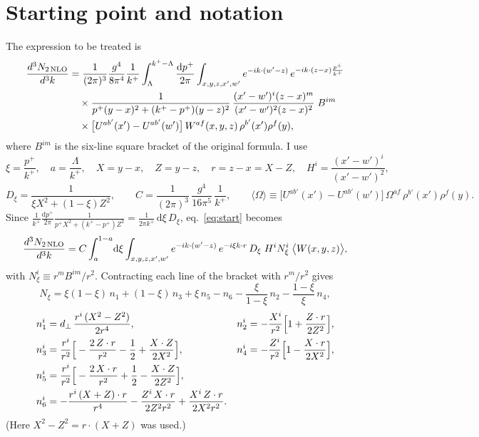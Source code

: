 \documentclass[11pt,a4paper]{article}
\newcommand{\dd}{\mathrm{d}}
\newcommand{\cl}[1]{\big\langle #1\big\rangle}
\begin{document}
\section{Starting point and notation}
The expression to be treated is
\begin{align}
\frac{d^{3}N_{2\,\rm NLO}}{d^{3}k}
&=\frac{1}{(2\pi)^{3}}\frac{g^{4}}{8\pi^{4}}\frac{1}{k^{+}}
\int_{\Lambda}^{k^{+}-\Lambda}\frac{\dd p^{+}}{2\pi}\int_{x,y,z,x',w'}
e^{-ik\cdot(w'-z)}\,e^{-ik\cdot(z-x)\frac{p^{+}}{k^{+}}}\notag\\
&\quad\times\frac{1}{p^{+}(y-x)^{2}+(k^{+}-p^{+})(y-z)^{2}}\,
\frac{(x'-w')^{i}(z-x)^{m}}{(x'-w')^{2}(z-x)^{2}}\;B^{im}\notag\\
&\quad\times
\big[U^{ab'}(x')-U^{ab'}(w')\big]\,W^{af}(x,y,z)\,\rho^{b'}(x')\rho^{f}(y),
\label{eq:start}
\end{align}
where $B^{im}$ is the six-line square bracket of the original formula. I use
\begin{equation}
\xi=\frac{p^+}{k^+},\quad a=\frac{\Lambda}{k^+},\quad
X=y-x,\quad Z=y-z,\quad r=z-x=X-Z,\quad H^i=\frac{(x'-w')^i}{(x'-w')^2},
\end{equation}
\begin{equation}
D_\xi=\frac{1}{\xi X^2+(1-\xi)Z^2},\qquad
C=\frac{1}{(2\pi)^3}\,\frac{g^4}{16\pi^5}\,\frac{1}{k^+},\qquad
\cl{\Omega}\equiv\big[U^{ab'}(x')-U^{ab'}(w')\big]\,\Omega^{af}\,\rho^{b'}(x')\rho^f(y).
\end{equation}
Since $\frac{1}{k^+}\frac{\dd p^+}{2\pi}\frac{1}{p^+X^2+(k^+-p^+)Z^2}=\frac{1}{2\pi k^+}\,\dd\xi\,D_\xi$,
eq.~\eqref{eq:start} becomes
\begin{equation}
\frac{d^{3}N_{2\,\rm NLO}}{d^{3}k}=C\int_a^{1-a}\!\dd\xi\int_{x,y,z,x',w'}
e^{-ik\cdot(w'-z)}\,e^{-i\xi k\cdot r}\,D_\xi\;H^i N^i_\xi\;\cl{W(x,y,z)} ,
\label{eq:compact}
\end{equation}
with $N^i_\xi\equiv r^mB^{im}/r^2$. Contracting each line of the bracket with $r^m/r^2$ gives
\begin{equation}
N_\xi=\xi(1-\xi)\,n_1+(1-\xi)\,n_3+\xi\,n_5-n_6-\frac{\xi}{1-\xi}\,n_2-\frac{1-\xi}{\xi}\,n_4 ,
\label{eq:N}
\end{equation}
\begin{align}
n_1^i&=d_\perp\,\frac{r^i\,(X^2-Z^2)}{2r^4}, &
n_2^i&=-\frac{X^i}{r^2}\Big[1+\frac{Z\cdot r}{2Z^2}\Big],\notag\\
n_3^i&=\frac{r^i}{r^2}\Big[-\frac{2\,Z\cdot r}{r^2}-\frac12+\frac{X\cdot Z}{2X^2}\Big], &
n_4^i&=-\frac{Z^i}{r^2}\Big[1-\frac{X\cdot r}{2X^2}\Big],\notag\\
n_5^i&=\frac{r^i}{r^2}\Big[-\frac{2\,X\cdot r}{r^2}+\frac12-\frac{X\cdot Z}{2Z^2}\Big],\notag\\
n_6^i&=-\frac{r^i\,(X+Z)\cdot r}{r^4}-\frac{Z^i\,X\cdot r}{2Z^2r^2}+\frac{X^i\,Z\cdot r}{2X^2r^2}.
\label{eq:n}
\end{align}
(Here $X^2-Z^2=r\cdot(X+Z)$ was used.)
\end{document}

